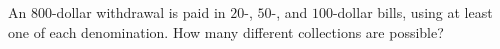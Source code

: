 An $800$-dollar withdrawal is paid in $20$-, $50$-, and $100$-dollar bills, using at least one of each denomination. How many different collections are possible?

